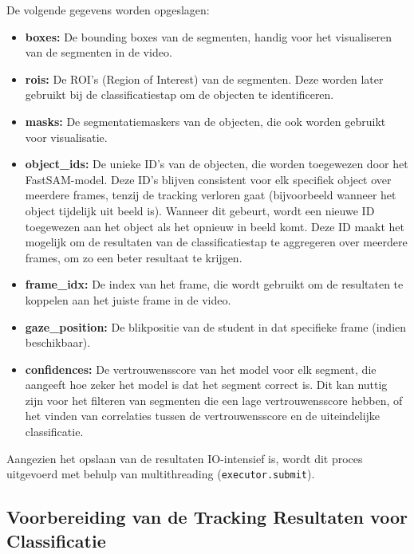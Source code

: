 De volgende gegevens worden opgeslagen:
\begin{itemize}
    \item \textbf{boxes:} De bounding boxes van de segmenten, handig voor het visualiseren van de segmenten in de video.
    \item \textbf{rois:} De ROI's (Region of Interest) van de segmenten. Deze worden later gebruikt bij de classificatiestap om de objecten te identificeren.
    \item \textbf{masks:} De segmentatiemaskers van de objecten, die ook worden gebruikt voor visualisatie.
    \item \textbf{object\_ids:} De unieke ID's van de objecten, die worden toegewezen door het FastSAM-model. Deze ID's blijven consistent voor elk specifiek object over meerdere frames,
    tenzij de tracking verloren gaat (bijvoorbeeld wanneer het object tijdelijk uit beeld is). Wanneer dit gebeurt, wordt een nieuwe ID toegewezen aan het object als het opnieuw in beeld komt.
    Deze ID maakt het mogelijk om de resultaten van de classificatiestap te aggregeren over meerdere frames, om zo een beter resultaat te krijgen.
    \item \textbf{frame\_idx:} De index van het frame, die wordt gebruikt om de resultaten te koppelen aan het juiste frame in de video.
    \item \textbf{gaze\_position:} De blikpositie van de student in dat specifieke frame (indien beschikbaar).
    \item \textbf{confidences:} De vertrouwensscore van het model voor elk segment, die aangeeft hoe zeker het model is dat het segment correct is.
    Dit kan nuttig zijn voor het filteren van segmenten die een lage vertrouwensscore hebben, 
    of het vinden van correlaties tussen de vertrouwensscore en de uiteindelijke classificatie.
\end{itemize}
Aangezien het opslaan van de resultaten IO-intensief is, wordt dit proces uitgevoerd met behulp van multithreading (\texttt{executor.submit}).

\subsection{Voorbereiding van de Tracking Resultaten voor Classificatie}
\label{sec:voorbereiding-tracking-resultaten}

